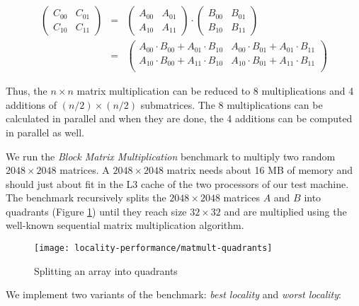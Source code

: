 \begin{eqnarray*}
  \begin{pmatrix}
    C_{00} & C_{01} \\
    C_{10} & C_{11}
  \end{pmatrix}
  &
  =
  &
  \begin{pmatrix}
    A_{00} & A_{01} \\
    A_{10} & A_{11}
  \end{pmatrix}
  \cdot
  \begin{pmatrix}
    B_{00} & B_{01} \\
    B_{10} & B_{11}
  \end{pmatrix}
  \\[0.3cm]
  &
  =
  &
  \begin{pmatrix}
    A_{00} \cdot B_{00} + A_{01} \cdot B_{10} & A_{00} \cdot B_{01} + A_{01} \cdot B_{11} \\
    A_{10} \cdot B_{00} + A_{11} \cdot B_{10} & A_{10} \cdot B_{01} + A_{11} \cdot B_{11} \\
  \end{pmatrix}
\end{eqnarray*}

\vspace{0.5cm}

Thus, the $n \times n$ matrix multiplication can be reduced to 8
multiplications and 4 additions of $(n/2) \times (n/2)$
submatrices. The 8 multiplications can be calculated in parallel and
when they are done, the 4 additions can be computed in parallel as
well.

We run the \emph{Block Matrix Multiplication} benchmark to multiply
two random $2048 \times 2048$ matrices. A $2048 \times 2048$ matrix
needs about 16 MB of memory and should just about fit in the L3 cache
of the two processors of our test machine. The benchmark recursively
splits the $2048 \times 2048$ matrices $A$ and $B$ into quadrants
(Figure \ref{fig:locality-performance-matmult-quadrants}) until they
reach size $32 \times 32$ and are multiplied using the well-known
sequential matrix multiplication algorithm.

\begin{figure}[!ht]
  \centering
  \texttt{[image: locality-performance/matmult-quadrants]}
  \caption{Splitting an array into quadrants}
  \label{fig:locality-performance-matmult-quadrants}
\end{figure}

We implement two variants of the benchmark: \emph{best locality} and
\emph{worst locality}:

